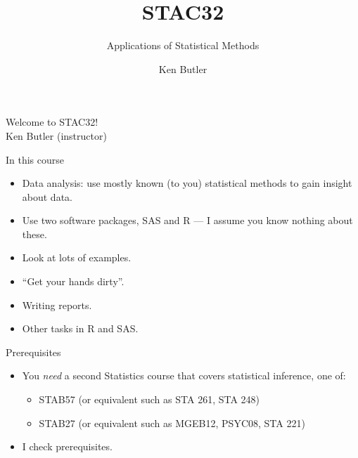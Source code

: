 \documentclass[unknownkeysallowed]{beamer}\usepackage[]{graphicx}\usepackage[]{color}
\title{STAC32}
\subtitle{Applications of Statistical Methods}
\author{Ken Butler}
\begin{document}
\maketitle




\begin{frame}[plain,c]
  \begin{center}
    {\Huge Welcome to STAC32! \\ \vspace{0.5in} Ken Butler (instructor)}
  \end{center}
\end{frame}


\begin{frame}{In this course}

  \begin{itemize}
  \item Data analysis: use mostly known (to you) statistical methods to gain
    insight about data.
  \item Use two software packages, SAS and R --- I assume you know
    nothing about these.
  \item Look at lots of examples.
  \item ``Get your hands dirty''.
  \item Writing reports.
  \item Other tasks in R and SAS.
  \end{itemize}
  
\end{frame}

\begin{frame}[fragile]{Prerequisites}
  
  
  \begin{itemize}
  \item 
      You \emph{need} a second Statistics course that covers statistical
  inference, one of: 
  
  \begin{itemize}
  \item STAB57 (or equivalent such as STA 261, STA 248)
  \item STAB27 (or equivalent such as MGEB12, PSYC08, STA 221)
  \end{itemize}
  
  \item I check prerequisites.

  \end{itemize}
  
\end{frame}
\end{document}
